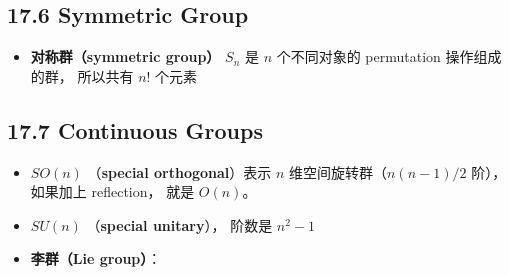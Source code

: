 \subsection{17.6 Symmetric Group}
\begin{itemize}
\item \textbf{对称群（symmetric group）} $S_n$ 是 $n$ 个不同对象的 permutation 操作组成的群， 所以共有 $n!$ 个元素
\end{itemize}

\subsection{17.7 Continuous Groups}
\begin{itemize}
\item $SO(n)$ （\textbf{special orthogonal}）表示 $n$ 维空间旋转群（$n(n-1)/2$ 阶）， 如果加上 reflection， 就是 $O(n)$。
\item $SU(n)$ （\textbf{special unitary}）， 阶数是 $n^2 - 1$
\item \textbf{李群（Lie group）}： 
\end{itemize}
